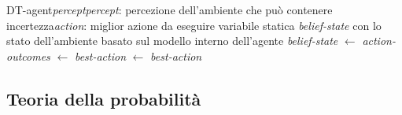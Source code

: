 \begin{algo}{DT-agent}{\textit{percept}}{\textit{percept}: percezione dell'ambiente che può contenere incertezza}{\textit{action}: miglior azione da eseguire}
	\State variabile statica \textit{belief-state} con lo stato dell'ambiente basato sul modello interno dell'agente
	\State \textit{belief-state} $\leftarrow$ 
	\State \textit{action-outcomes} $\leftarrow$ 
	\State \textit{best-action} $\leftarrow$ 
	\State \Return \textit{best-action}
\end{algo}

\subsection{Teoria della probabilità}
